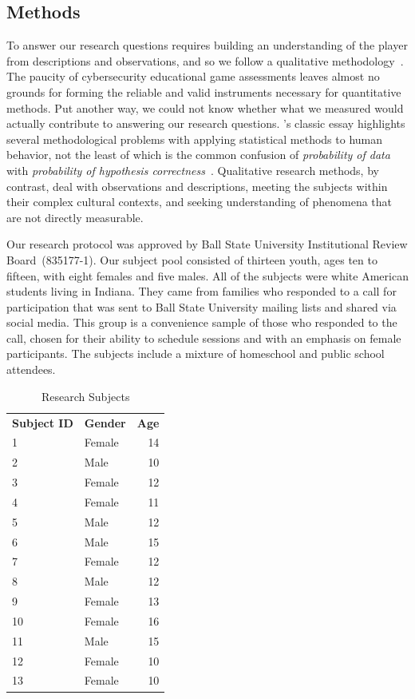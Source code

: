\documentclass[letterpaper]{article}
\begin{document}
\subsection{Methods}

To answer our research questions requires building an understanding of
the player from descriptions and observations, and so we follow a
qualitative methodology~\citep[see][for example]{Stake2010}.  The
paucity of cybersecurity educational game assessments leaves almost no
grounds for forming the reliable and valid instruments necessary for
quantitative methods. Put another way, we could not know whether what
we measured would actually contribute to answering our research
questions.  \citeauthor{Cohen1994}'s classic essay highlights several
methodological problems with applying statistical methods to human
behavior, not the least of which is the common confusion of
\textit{probability of data} with \textit{probability of hypothesis
  correctness}~\citep{Cohen1994}.
Qualitative research methods, by contrast, deal with 
observations and descriptions, meeting the subjects within their
complex cultural contexts, and seeking understanding of phenomena
that are not directly measurable. 

Our research protocol was approved by Ball State University
Institutional Review Board~(835177-1). 
Our subject pool consisted of thirteen youth, ages ten to fifteen,
with eight females and five males. All of the subjects were
white American students living in Indiana. 
They came from families who responded to a call for participation that
was sent to Ball State University mailing lists and shared via social
media. This group is a convenience sample of those who responded to the
call, chosen for their ability to schedule sessions and with an emphasis
on female participants. The subjects include a mixture of homeschool
and public school attendees.

\begin{table}
\begin{framed}
\centering
\begin{tabular}{llr}
\textbf{Subject ID} & \textbf{Gender} & \textbf{Age}\\
1 & Female & 14\\
2 & Male & 10\\
3 & Female & 12\\
4 & Female & 11\\
5 & Male & 12\\
6 & Male & 15\\
7 & Female & 12\\
8 & Male & 12\\
9 & Female & 13\\
10 & Female & 16\\
11 & Male & 15\\
12 & Female & 10\\
13 & Female & 10\\
\end{tabular}
\caption{Research Subjects}
\end{framed}
\end{table}
\end{document}
